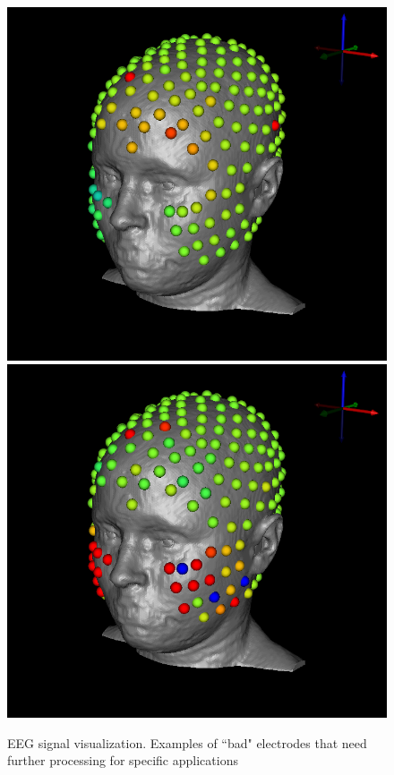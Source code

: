 \begin{figure}[H]
\begin{center}
\includegraphics[width=.49\textwidth]{Figures/eeg_1}
\includegraphics[width=.49\textwidth]{Figures/eeg_2}
\caption{EEG signal visualization. Examples of ``bad" electrodes that need further processing for specific applications}
\label{fig:eegvis}
\end{center}
\end{figure}